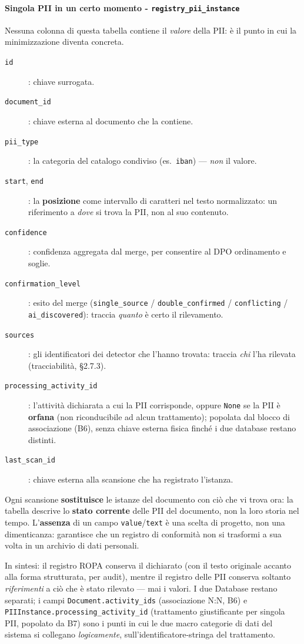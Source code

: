 \paragraph*{Singola PII in un certo momento - \texttt{registry\_pii\_instance}}
Nessuna colonna di questa tabella contiene il \emph{valore} della PII: è il punto in cui la minimizzazione diventa concreta.
\begin{description}
	\item[\texttt{id}]: chiave surrogata.
	\item[\texttt{document\_id}]: chiave esterna al documento che la contiene.
	\item[\texttt{pii\_type}]: la categoria del catalogo condiviso (es.\ \texttt{iban}) --- \emph{non} il valore.
	\item[\texttt{start}, \texttt{end}]: la \textbf{posizione} come intervallo di caratteri nel testo normalizzato: un riferimento a \emph{dove} si trova la PII, non al suo contenuto.
	\item[\texttt{confidence}]: confidenza aggregata dal merge, per consentire al DPO ordinamento e soglie.
	\item[\texttt{confirmation\_level}]: esito del merge (\texttt{single\_source} / \texttt{double\_confirmed} / \texttt{conflicting} / \texttt{ai\_discovered}): traccia \emph{quanto} è certo il rilevamento.
	\item[\texttt{sources}]: gli identificatori dei detector che l'hanno trovata: traccia \emph{chi} l'ha rilevata (tracciabilità, §2.7.3).
	\item[\texttt{processing\_activity\_id}]: l'attività dichiarata a cui la PII corrisponde, oppure \texttt{None} se la PII è \textbf{orfana} (non riconducibile ad alcun trattamento); popolata dal blocco di associazione (B6), senza chiave esterna fisica finché i due database restano distinti.
	\item[\texttt{last\_scan\_id}]: chiave esterna alla scansione che ha registrato l'istanza.
\end{description}

Ogni scansione \textbf{sostituisce} le istanze del documento con ciò che vi trova ora: la tabella descrive lo \textbf{stato corrente} delle PII del documento, non la loro storia nel tempo.
L'\textbf{assenza} di un campo \texttt{value}/\texttt{text} è una scelta di progetto, non una dimenticanza: garantisce che un registro di conformità non si trasformi a sua volta in un archivio di dati personali.

In sintesi: il registro ROPA conserva il dichiarato (con il testo originale accanto alla forma strutturata, per audit), mentre il registro delle PII conserva soltanto \emph{riferimenti} a ciò che è stato rilevato --- mai i valori. I due Database restano separati; i campi \texttt{Document.activity\_ids} (associazione N:N, B6) e \texttt{PIIInstance.processing\_activity\_id} (trattamento giustificante per singola PII, popolato da B7) sono i punti in cui le due macro categorie di dati del sistema si collegano \emph{logicamente}, sull'identificatore-stringa del trattamento.

